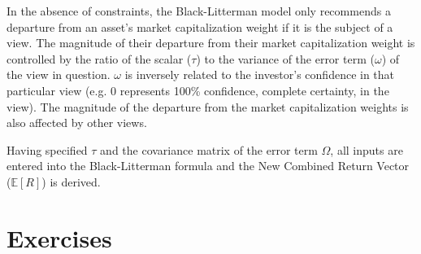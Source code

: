 In the absence of constraints, the Black-Litterman model only recommends a departure from an asset’s market capitalization weight if it is the subject of a view. The magnitude of their departure from their market capitalization weight is controlled by the ratio of the scalar ($\tau$) to the variance of the error term ($\omega$) of the view in question. $\omega$ is inversely related to the investor’s confidence in that particular view (e.g. 0 represents 100\% confidence, complete certainty, in the view). The magnitude of the departure from the market capitalization weights is also affected by other views. %

Having specified $\tau$ and the covariance matrix of the error term $\Omega$, all inputs are entered into the Black-Litterman formula and the New Combined Return Vector ($\mathbb{E}[R]$) is derived.

\newpage
\section*{Exercises}

